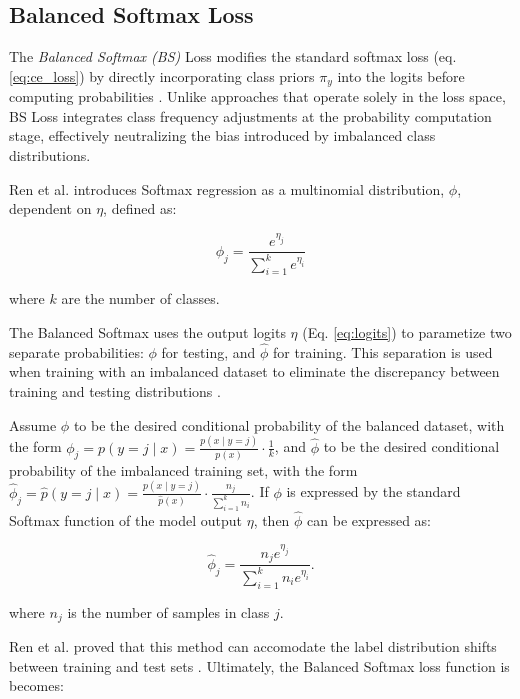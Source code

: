 \subsection{Balanced Softmax Loss}
\label{sec:bs_loss}
The \emph{Balanced Softmax (BS)} Loss modifies the standard softmax loss (eq. \eqref{eq:ce_loss}) by directly incorporating class priors $\pi_y$ into the logits before computing probabilities \cite{ren2020balancedmetasoftmaxlongtailedvisual}. Unlike approaches that operate solely in the loss space, BS Loss integrates class frequency adjustments at the probability computation stage, effectively neutralizing the bias introduced by imbalanced class distributions. 

Ren et al. \cite{ren2020balancedmetasoftmaxlongtailedvisual} introduces Softmax regression as a multinomial distribution, $\phi$, dependent on $\eta$, defined as:

\begin{equation}
    \phi_j = \frac{e^{\eta_j}}{\sum_{i=1}^{k}e^{\eta_i}}
\end{equation}

\noindent where $k$ are the number of classes.

The Balanced Softmax uses the output logits $\eta$ (Eq. \eqref{eq:logits}) to parametize two separate probabilities: $\phi$ for testing, and $\hat{\phi}$ for training. This separation is used when training with an imbalanced dataset to eliminate the discrepancy between training and testing distributions \cite{ren2020balancedmetasoftmaxlongtailedvisual}.

Assume $\phi$ to be the desired conditional probability of the balanced dataset, with the form $\phi_j = p(y = j \mid x) = \frac{p(x \mid y=j)}{p(x)} \cdot \frac{1}{k}$, and $\hat{\phi}$ to be the desired conditional probability of the imbalanced training set, with the form $\hat{\phi}_j = \hat{p}(y = j \mid x) = \frac{p(x \mid y=j)}{\hat{p}(x)} \cdot \frac{n_j}{\sum_{i=1}^{k} n_i}$. If $\phi$ is expressed by the standard Softmax function of the model output $\eta$, then $\hat{\phi}$ can be expressed as:

\begin{equation}
    \hat{\phi}_j = \frac{n_j e^{\eta_j}}{\sum_{i=1}^{k} n_i e^{\eta_i}}.
\end{equation}

\noindent where $n_j$ is the number of samples in class $j$.

Ren et al. \cite{ren2020balancedmetasoftmaxlongtailedvisual} proved that this method can accomodate the label distribution shifts between training and test sets \cite{ren2020balancedmetasoftmaxlongtailedvisual}. Ultimately, the Balanced Softmax loss function is becomes:

